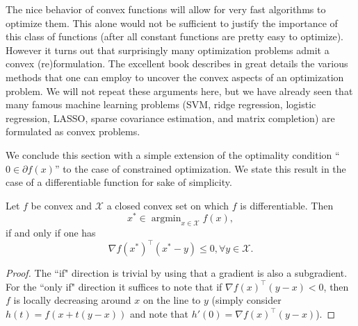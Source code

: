 \documentclass[openany]{now}
\newcommand{\cX}{\mathcal{X}}
\newcommand{\argmin}{\mathop{\mathrm{argmin}}}
\begin{document}
The nice behavior of convex functions will allow for very fast algorithms to optimize them. This alone would not be sufficient to justify the importance of this class of functions (after all constant functions are pretty easy to optimize). However it turns out that surprisingly many optimization problems admit a convex (re)formulation. The excellent book \cite{BV04} describes in great details the various methods that one can employ to uncover the convex aspects of an optimization problem. We will not repeat these arguments here, but we have already seen that many famous machine learning problems (SVM, ridge regression, logistic regression, LASSO, sparse covariance estimation, and matrix completion) are formulated as convex problems.

We conclude this section with a simple extension of the optimality condition ``$0 \in \partial f(x)$'' to the case of constrained optimization. We state this result in the case of a differentiable function for sake of simplicity.
\begin{proposition} \label{prop:firstorder}
Let $f$ be convex and $\cX$ a closed convex set on which $f$ is differentiable. Then
$$x^* \in \argmin_{x \in \cX} f(x) ,$$
if and only if one has
$$\nabla f(x^*)^{\top}(x^*-y) \leq 0, \forall y \in \cX .$$
\end{proposition}

\begin{proof}
The ``if" direction is trivial by using that a gradient is also a subgradient. For the ``only if" direction it suffices to note that if $\nabla f(x)^{\top} (y-x) < 0$, then $f$ is locally decreasing around $x$ on the line to $y$ (simply consider $h(t) = f(x + t (y-x))$ and note that $h'(0) = \nabla f(x)^{\top} (y-x)$).
\end{proof}
\end{document}
